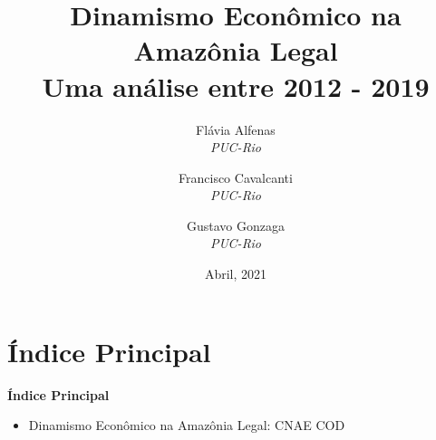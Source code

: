 \documentclass[8pt]{beamer}
\author{
Flávia  Alfenas\\
\textit{PUC-Rio}\\ \vspace{3mm}
\and  
Francisco Cavalcanti\\
\textit{PUC-Rio}\\ \vspace{3mm}
\and   
Gustavo Gonzaga \\
\textit{PUC-Rio} 
}
\date{Abril, 2021}
\title{Dinamismo Econômico na Amazônia Legal \\ Uma análise entre 2012 - 2019}
\begin{document}

\begin{frame}
\titlepage
\end{frame}


\section{Índice Principal}

\begin{frame}[label=indice_principal]{}

\textbf{Índice Principal}
\vspace{2mm}
\begin{itemize}

\item{Dinamismo Econômico na Amazônia Legal:  CNAE	\hyperlink{amzcnae2dig}{} COD 	\hyperlink{amzcod2dig}{}}
\vspace{2mm}


\end{itemize}
\end{frame}
\end{document}
